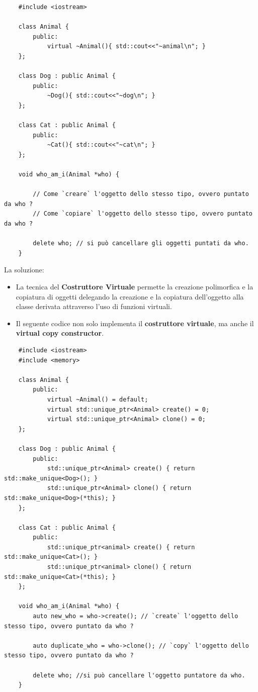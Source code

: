 \begin{lstlisting}
	#include <iostream>
	
	class Animal {
		public:
			virtual ~Animal(){ std::cout<<"~animal\n"; }
	};
	
	class Dog : public Animal {
		public:
			~Dog(){ std::cout<<"~dog\n"; }
	};
	
	class Cat : public Animal {
		public:
			~Cat(){ std::cout<<"~cat\n"; }
	};
	
	void who_am_i(Animal *who) {
		
		// Come `creare` l'oggetto dello stesso tipo, ovvero puntato da who ?
		// Come `copiare` l'oggetto dello stesso tipo, ovvero puntato da who ?
		
		delete who; // si può cancellare gli oggetti puntati da who.
	}
\end{lstlisting}

\textsf{\small La soluzione: } \\

\begin{itemize}
	\item \textsf{\small La tecnica del \textbf{Costruttore Virtuale} permette la creazione polimorfica e la copiatura di oggetti delegando la creazione e la copiatura dell'oggetto alla classe derivata attraverso l'uso di funzioni virtuali.}
	\item \textsf{\small Il seguente codice non solo implementa il \textbf{costruttore virtuale}, ma anche il \textbf{virtual copy constructor}.}
\end{itemize}

\begin{lstlisting}
	#include <iostream>
	#include <memory>
	
	class Animal {
		public:
			virtual ~Animal() = default;
			virtual std::unique_ptr<Animal> create() = 0;
			virtual std::unique_ptr<Animal> clone() = 0;
	};
	
	class Dog : public Animal {
		public:
			std::unique_ptr<Animal> create() { return std::make_unique<Dog>(); }
			std::unique_ptr<Animal> clone() { return std::make_unique<Dog>(*this); }
	};
	
	class Cat : public Animal {
		public:
			std::unique_ptr<animal> create() { return std::make_unique<Cat>(); }
			std::unique_ptr<animal> clone() { return std::make_unique<Cat>(*this); }
	};
	
	void who_am_i(Animal *who) {
		auto new_who = who->create(); // `create` l'oggetto dello stesso tipo, ovvero puntato da who ?
		
		auto duplicate_who = who->clone(); // `copy` l'oggetto dello stesso tipo, ovvero puntato da who ?    
		
		delete who; //si può cancellare l'oggetto puntatore da who.
	}
\end{lstlisting}

